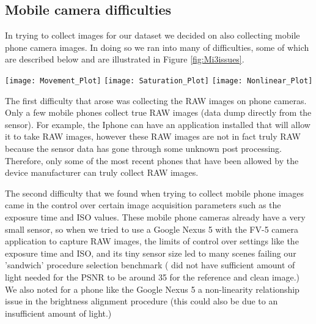 \documentclass[review]{elsarticle}
\begin{document}
\subsection{Mobile camera difficulties}


In trying to collect images for our dataset we decided on also collecting mobile phone camera images. In doing so we ran into many of difficulties, some of which are described below and are illustrated in Figure \ref{fig:Mi3issues}. 
\begin{figure*}[htb]
\vspace{-3mm}
\centering
\hspace{-2mm}
\texttt{[image: Movement\_Plot]}
\hspace{-2mm}
\texttt{[image: Saturation\_Plot]}
\hspace{-2mm}
\texttt{[image: Nonlinear\_Plot]}
\vskip-5mm
\caption{Intensity alignment issues observed on scatter plots of the intensity difference between the reference image and aligned noisy image vs reference image intensity. Left: image movement during the 'sandwich' procedure. Middle: light saturation. Right: non-linearity at high ISO levels.}\label {fig:Mi3issues}
\vspace{-4mm}
\end{figure*}


The first difficulty that arose was collecting the RAW images on phone cameras. Only a few mobile phones collect true RAW images (data dump directly from the sensor). For example, the Iphone can have an application installed that will allow it to take RAW images, however these RAW images are not in fact truly RAW because the sensor data has gone through some unknown post processing. Therefore, only some of the most recent phones that have been allowed by the device manufacturer can truly collect RAW images.

The second difficulty that we found when trying to collect mobile phone images came in the control over certain image acquisition parameters such as the exposure time and ISO values. These mobile phone cameras already have a very small sensor, so when we tried to use a Google Nexus 5 with the  FV-5 camera application to capture RAW images, the limits of control over settings like the exposure time and ISO, and its tiny sensor size led to many scenes failing our 'sandwich' procedure selection benchmark ( did not have sufficient amount of light needed for the PSNR to be around 35 for the reference and clean image.) We also noted for a phone like the Google Nexus 5 a non-linearity relationship issue in the brightness alignment procedure (this could also be due to an insufficient amount of light.) 
\end{document}
